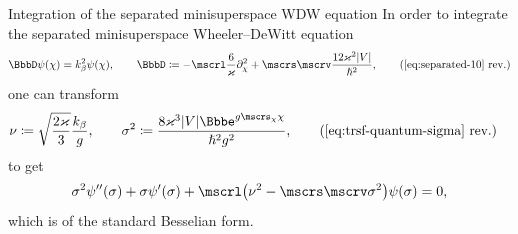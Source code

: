 \documentclass[9pt]{beamer}
\begin{document}
\begin{frame}%
{Integration of the separated minisuperspace WDW equation}%
In order to integrate the separated minisuperspace Wheeler--DeWitt equation
\begin{align}
\BbbD \rfun{\psi}{\chi} = k_\beta^2 \rfun{\psi}{\chi},\qquad
\BbbD \coloneqq
-\mscrl \frac{6}{\varkappa} \partial_\chi^2
+ \mscrs\mscrv \frac{12\varkappa^2\vbr{V}}{\hslash^2},
\tag{\ref{eq:separated-10} rev.}
\end{align}
one can transform
\begin{align}
\nu &\coloneqq \sqrt{\frac{2\varkappa}{3}}\frac{k_\beta}{g},\qquad
\sigma^2 \coloneqq 
\frac{8\varkappa^3\vbr{V}\ee^{g\mscrs_\chi\chi}}{\hslash^2 g^2},
\tag{\ref{eq:trsf-quantum-sigma} rev.}
\end{align}
to get
\begin{align}
\sigma^2\rfun{\psi''}{\sigma}
+\sigma\rfun{\psi'}{\sigma}
+\mscrl\rbr{\nu^2-\mscrs\mscrv\sigma^2}\rfun{\psi}{\sigma} = 0,
\end{align}
which is of the standard Besselian form.
\end{frame}




%
\end{document}
